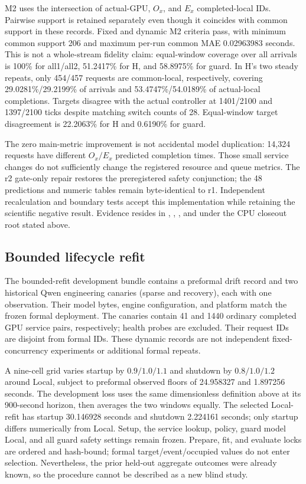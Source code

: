 M2 uses the intersection of actual-GPU, $O_x$, and $E_x$ completed-local IDs.
Pairwise support is retained separately even though it coincides with common
support in these records. Fixed and dynamic M2 criteria pass, with minimum
common support 206 and maximum per-run common MAE 0.02963983 seconds. This is
not a whole-stream fidelity claim: equal-window coverage over all arrivals is
100\% for all1/all2, 51.2417\% for H, and 58.8975\% for guard. In H's two
steady repeats, only 454/457 requests are common-local, respectively, covering
29.0281\%/29.2199\% of arrivals and 53.4747\%/54.0189\% of actual-local
completions. Targets disagree with the actual controller at 1401/2100 and
1397/2100 ticks despite matching switch counts of 28. Equal-window target
disagreement is 22.2063\% for H and 0.6190\% for guard.

The zero main-metric improvement is not accidental model duplication: 14,324
requests have different $O_x/E_x$ predicted completion times. Those small
service changes do not sufficiently change the registered resource and queue
metrics. The r2 gate-only repair restores the preregistered safety conjunction;
the 48 predictions and numeric tables remain byte-identical to r1. Independent
recalculation and boundary tests accept this implementation while retaining the
scientific negative result. Evidence resides in ,
, , and
 under the CPU closeout root stated above.

\subsection{Bounded lifecycle refit}
The bounded-refit development bundle contains a preformal drift record and two historical
Qwen engineering canaries (sparse and recovery), each with one observation.
Their model bytes, engine configuration, and platform match the frozen formal
deployment. The canaries contain 41 and 1440 ordinary completed GPU service
pairs, respectively; health probes are excluded. Their request IDs are disjoint
from formal IDs. These dynamic records are not independent fixed-concurrency
experiments or additional formal repeats.

A nine-cell grid varies startup by $0.9/1.0/1.1$ and shutdown by
$0.8/1.0/1.2$ around Local, subject to preformal observed floors of 24.958327 and
1.897256 seconds. The development loss uses the same dimensionless definition
above at its 900-second horizon, then averages the two windows equally. The
selected Local-refit has startup 30.146928 seconds and shutdown 2.224161 seconds;
only startup differs numerically from Local. Setup, the service lookup, policy,
guard model Local, and all guard safety settings remain frozen. Prepare, fit, and
evaluate locks are ordered and hash-bound; formal target/event/occupied values
do not enter selection. Nevertheless, the prior held-out aggregate outcomes were
already known, so the procedure cannot be described as a new blind study.

